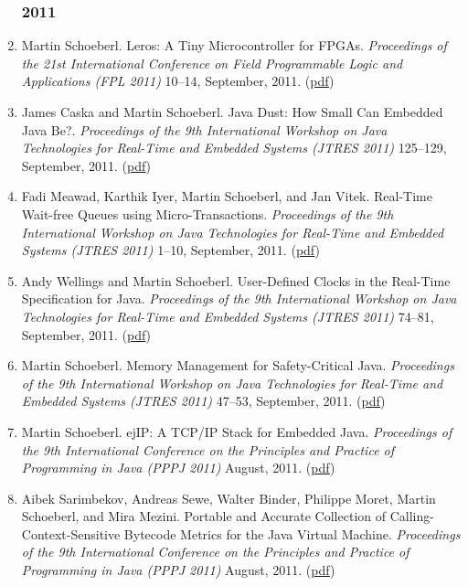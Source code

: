 \begin{enumerate}
\subsubsection*{2011}

\item Martin Schoeberl.
 Leros: A Tiny Microcontroller for FPGAs.
 \emph{Proceedings of the 21st International Conference on Field Programmable Logic and Applications (FPL 2011)} 10--14, September, 2011.
(\href{http://www.jopdesign.com/doc/leros.pdf}{pdf})

\item James Caska and Martin Schoeberl.
 Java Dust: How Small Can Embedded Java Be?.
 \emph{Proceedings of the 9th International Workshop on Java Technologies for Real-Time and Embedded Systems (JTRES 2011)} 125--129, September, 2011.
(\href{http://www.jopdesign.com/doc/lerosjvm.pdf}{pdf})

\item Fadi Meawad, Karthik Iyer, Martin Schoeberl, and Jan Vitek.
 Real-Time Wait-free Queues using Micro-Transactions.
 \emph{Proceedings of the 9th International Workshop on Java Technologies for Real-Time and Embedded Systems (JTRES 2011)} 1--10, September, 2011.
(\href{http://www.jopdesign.com/doc/utran.pdf}{pdf})

\item Andy Wellings and Martin Schoeberl.
 User-Defined Clocks in the Real-Time Specification for Java.
 \emph{Proceedings of the 9th International Workshop on Java Technologies for Real-Time and Embedded Systems (JTRES 2011)} 74--81, September, 2011.
(\href{http://www.jopdesign.com/doc/udclocks.pdf}{pdf})

\item Martin Schoeberl.
 Memory Management for Safety-Critical Java.
 \emph{Proceedings of the 9th International Workshop on Java Technologies for Real-Time and Embedded Systems (JTRES 2011)} 47--53, September, 2011.
(\href{http://www.jopdesign.com/doc/scjscopes.pdf}{pdf})

\item Martin Schoeberl.
 ejIP: A TCP/IP Stack for Embedded Java.
 \emph{Proceedings of the 9th International Conference on the Principles and Practice of Programming in Java (PPPJ 2011)} August, 2011.
(\href{http://www.jopdesign.com/doc/ejip.pdf}{pdf})

\item Aibek Sarimbekov, Andreas Sewe, Walter Binder, Philippe Moret, Martin Schoeberl, and Mira Mezini.
 Portable and Accurate Collection of Calling-Context-Sensitive Bytecode Metrics for the Java Virtual Machine.
 \emph{Proceedings of the 9th International Conference on the Principles and Practice of Programming in Java (PPPJ 2011)} August, 2011.
(\href{http://www.jopdesign.com/doc/jp2pppj2011.pdf}{pdf})


\end{enumerate}
